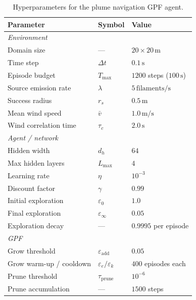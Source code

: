 \begin{table}[h]
\centering
\caption{Hyperparameters for the plume navigation GPF agent.}
\label{tab:gpf_hyperparams}
\begin{tabular}{lll}
\toprule
\textbf{Parameter} & \textbf{Symbol} & \textbf{Value} \\
\midrule
\multicolumn{3}{l}{\textit{Environment}} \\
Domain size           & ---                    & $20 \times 20\,\text{m}$ \\
Time step             & $\Delta t$             & $0.1\,\text{s}$ \\
Episode budget        & $T_{\max}$             & $1200$ steps ($100\,\text{s}$) \\
Source emission rate  & $\lambda$              & $5\,\text{filaments/s}$ \\
Success radius        & $r_s$                  & $0.5\,\text{m}$ \\
Mean wind speed       & $\bar{v}$              & $1.0\,\text{m/s}$ \\
Wind correlation time & $\tau_c$               & $2.0\,\text{s}$ \\
\midrule
\multicolumn{3}{l}{\textit{Agent / network}} \\
Hidden width          & $d_h$                  & $64$ \\
Max hidden layers     & $L_{\max}$             & $4$ \\
Learning rate         & $\eta$                 & $10^{-3}$ \\
Discount factor       & $\gamma$               & $0.99$ \\
Initial exploration   & $\varepsilon_0$        & $1.0$ \\
Final exploration     & $\varepsilon_\infty$   & $0.05$ \\
Exploration decay     & ---                    & $0.9995$ per episode \\
\midrule
\multicolumn{3}{l}{\textit{GPF}} \\
Grow threshold        & $\varepsilon_{\text{add}}$ & $0.05$ \\
Grow warm-up / cooldown & $\varepsilon_e / \varepsilon_k$ & $400$ episodes each \\
Prune threshold       & $\tau_{\text{prune}}$  & $10^{-6}$ \\
Prune accumulation    & ---                    & $1500$ steps \\
\bottomrule
\end{tabular}
\end{table}
